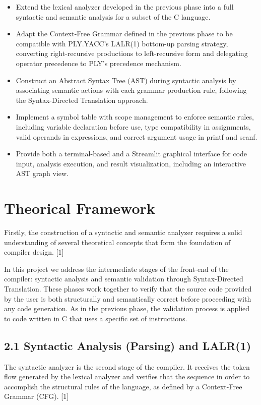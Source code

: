 \documentclass[letterpaper,12pt,oneside]{article}
\begin{document}
\begin{itemize}
    \item Extend the lexical analyzer developed in the previous phase into a full syntactic and semantic analysis for a subset of the C language.
    \item Adapt the Context-Free Grammar defined in the previous phase to be compatible with PLY.YACC's LALR(1) bottom-up parsing strategy, converting right-recursive productions to left-recursive form and delegating operator precedence to PLY's precedence mechanism.
    \item Construct an Abstract Syntax Tree (AST) during syntactic analysis by associating semantic actions with each grammar production rule, following the Syntax-Directed Translation approach.
    \item Implement a symbol table with scope management to enforce semantic rules, including variable declaration before use, type compatibility in assignments, valid operands in expressions, and correct argument usage in printf and scanf.
    \item Provide both a terminal-based and a Streamlit graphical interface for code input, analysis execution, and result visualization, including an interactive AST graph view.
\end{itemize}

\section{Theorical Framework}
Firstly, the construction of a syntactic and semantic analyzer requires a solid understanding of several theoretical concepts that form the foundation of compiler design. [1]

In this project we address the intermediate stages of the front-end of the compiler: syntactic analysis and semantic validation through Syntax-Directed Translation. These phases work together to verify that the source code provided by the user is both structurally and semantically correct before proceeding with any code generation. As in the previous phase, the validation process is applied to code written in C that uses a specific set of instructions.


\subsection*{2.1 Syntactic Analysis (Parsing) and LALR(1)}

The syntactic analyzer is the second stage of the compiler. It receives the token flow generated by the lexical analyzer and verifies that the sequence in order to accomplish the structural rules of the language, as defined by a Context-Free Grammar (CFG). [1]
\end{document}
